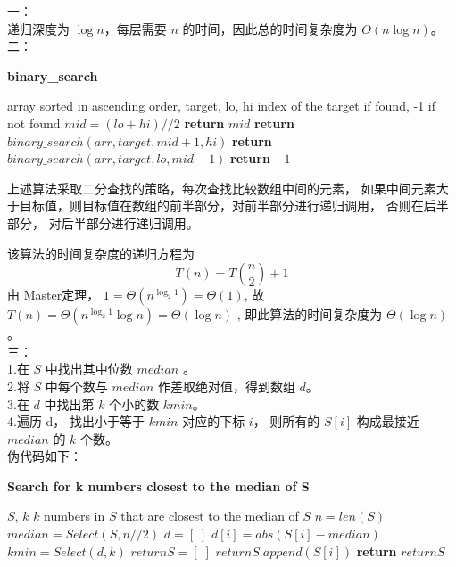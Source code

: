 \documentclass{article}
\begin{document}
\setlength{\parindent}{0pt}

一：
\\
递归深度为 $\log n$，每层需要 $n$ 的时间，因此总的时间复杂度为 $O(n \log n)$。
\\
二：
\begin{algorithm}
    \caption{\textbf{binary\_search}}
    \label{alg:search}
    \begin{algorithmic}[1]
        \REQUIRE array sorted in ascending order, target, lo, hi
        \ENSURE index of the target if found, -1 if not found
        \STATE $mid = (lo + hi) // 2$
        \STATE \textbf{return} $mid$
        \STATE \textbf{return} $binary\_search(arr, target, mid + 1, hi)$
        \ELSE
        \STATE \textbf{return} $binary\_search(arr, target, lo, mid - 1)$
        \ENDIF
        \ENDWHILE
        \STATE \textbf{return} $-1$
    \end{algorithmic}
\end{algorithm}

上述算法采取二分查找的策略，每次查找比较数组中间的元素，
如果中间元素大于目标值，则目标值在数组的前半部分，对前半部分进行递归调用，
否则在后半部分， 对后半部分进行递归调用。

该算法的时间复杂度的递归方程为
$$
T(n) = T(\frac{n}{2}) + 1
$$
由 Master定理， $1 = \Theta(n^{\log_{2}1}) = \Theta(1)$, 
故 $T(n) = \Theta(n^{\log_{2}1}\log n) = \Theta(\log n)$ , 
即此算法的时间复杂度为 $\Theta(\log n)$。 \\

\newpage
三：\\
1.在 $S$ 中找出其中位数 $median$ 。 \\
2.将 $S$ 中每个数与 $median$ 作差取绝对值，得到数组 $d$。\\
3.在 $d$ 中找出第 $k$ 个小的数 $kmin$。 \\
4.遍历 d， 找出小于等于 $kmin$ 对应的下标 $i$， 则所有的 $S[i]$ 构成最接近 $median$ 的 $k$ 个数。\\
伪代码如下：

\begin{algorithm}
    \caption{\textbf{Search for k numbers closest to the median of S}}
    \label{alg:search_k_median}
    \begin{algorithmic}[1]
        \REQUIRE $S$, $k$
        \ENSURE $k$ numbers in $S$ that are closest to the median of $S$
        \STATE $n = len(S)$
        \STATE $median = Select(S, n // 2)$
        \STATE $d = [\; ]$
        \STATE $d[i] = abs(S[i] - median)$
        \ENDFOR
        \STATE $kmin = Select(d, k)$
        \STATE $returnS = [\; ]$
        \STATE $returnS.append(S[i])$
        \ENDIF 
        \ENDFOR
        \STATE \textbf{return} $returnS$
    \end{algorithmic}
\end{algorithm}
\end{document}
